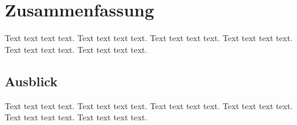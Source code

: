 \documentclass[a4paper]{llncs}
\begin{document}
\section{Zusammenfassung}
\label{Zusammenfassung}
Text text text text. Text text text text. Text text text text. Text text text text. Text text text text. Text text text text. 

\subsection{Ausblick}
Text text text text. Text text text text. Text text text text. Text text text text. Text text text text. Text text text text. 



 
\end{document}
